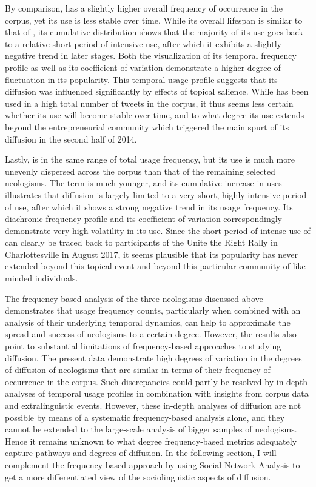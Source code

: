 \documentclass[
  a4paper,
  abstract=on,
  captions=tableabove
  ]{scrartcl}
\begin{document}
        By comparison,  has a slightly higher overall frequency of occurrence in the corpus, yet its use is less stable over time. While its overall lifespan is similar to that of , its cumulative distribution shows that the majority of its use goes back to a relative short period of intensive use, after which it exhibits a slightly negative trend in later stages. Both the visualization of its temporal frequency profile as well as its coefficient of variation demonstrate a higher degree of fluctuation in its popularity. This temporal usage profile suggests that its diffusion was influenced significantly by effects of topical salience. While  has been used in a high total number of tweets in the corpus, it thus seems less certain whether its use will become stable over time, and to what degree its use extends beyond the entrepreneurial community which triggered the main spurt of its diffusion in the second half of 2014.

        Lastly,  is in the same range of total usage frequency, but its use is much more unevenly dispersed across the corpus than that of the remaining selected neologisms. The term is much younger, and its cumulative increase in uses illustrates that diffusion is largely limited to a very short, highly intensive period of use, after which it shows a strong negative trend in its usage frequency. Its diachronic frequency profile and its coefficient of variation correspondingly demonstrate very high volatility in its use. Since the short period of intense use of  can clearly be traced back to participants of the Unite the Right Rally in Charlottesville in August 2017, it seems plausible that its popularity has never extended beyond this topical event and beyond this particular community of like-minded individuals.
        
        The frequency-based analysis of the three neologisms discussed above demonstrates that usage frequency counts, particularly when combined with an analysis of their underlying temporal dynamics, can help to approximate the spread and success of neologisms to a certain degree. However, the results also point to substantial limitations of frequency-based approaches to studying diffusion. The present data demonstrate high degrees of variation in the degrees of diffusion of neologisms that are similar in terms of their frequency of occurrence in the corpus. Such discrepancies could partly be resolved by in-depth analyses of temporal usage profiles in combination with insights from corpus data and extralinguistic events. However, these in-depth analyses of diffusion are not possible by means of a systematic frequency-based analysis alone, and they cannot be extended to the large-scale analysis of bigger samples of neologisms. Hence it remains unknown to what degree frequency-based metrics adequately capture pathways and degrees of diffusion. In the following section, I will complement the frequency-based approach by using Social Network Analysis to get a more differentiated view of the sociolinguistic aspects of diffusion.
\end{document}

